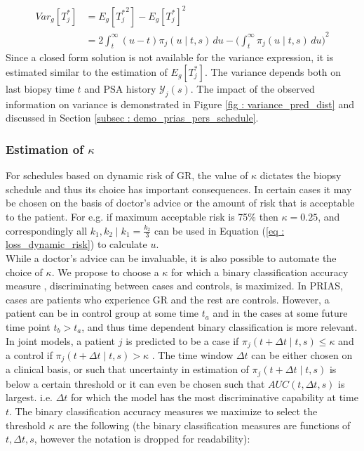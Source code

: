 \begin{equation}
\begin{split}
Var_g[T^*_j] &= E_g[{T^*_j}^2] - {E_g[T^*_j]}^2\\
&= 2 \int_t^\infty {(u-t) \pi_j(u \mid t, s) \,du} - {\bigg(\int_t^\infty \pi_j(u \mid t, s) \,du\bigg)}^2
\end{split}
\end{equation}
Since a closed form solution is not available for the variance expression, it is estimated similar to the estimation of $E_g[T^*_j]$. The variance depends both on last biopsy time $t$ and PSA history $\mathcal{Y}_j(s)$. The impact of the observed information on variance is demonstrated in Figure \ref{fig : variance_pred_dist} and discussed in Section \ref{subsec : demo_prias_pers_schedule}.

\subsubsection{Estimation of $\kappa$}
\label{subsubsec : kappa_estimation}
For schedules based on dynamic risk of GR, the value of $\kappa$ dictates the biopsy schedule and thus its choice has important consequences. In certain cases it may be chosen on the basis of doctor's advice or the amount of risk that is acceptable to the patient. For e.g. if maximum acceptable risk is 75\% then $\kappa = 0.25$, and correspondingly all $k_1, k_2 \mid k_1=\frac{k_2}{3}$ can be used in Equation (\ref{eq : loss_dynamic_risk}) to calculate $u$.\\

While a doctor's advice can be invaluable, it is also possible to automate the choice of $\kappa$. We propose to choose a $\kappa$ for which a binary classification accuracy measure \citep{lopez2014optimalcutpoints,sokolova2009systematic}, discriminating between cases and controls, is maximized. In PRIAS, cases are patients who experience GR and the rest are controls. However, a patient can be in control group at some time $t_a$ and in the cases at some future time point $t_b > t_a$, and thus time dependent binary classification is more relevant. In joint models, a patient $j$ is predicted to be a case if $\pi_j(t + \Delta t \mid t,s) \leq \kappa$ and a control if $\pi_j(t + \Delta t \mid t,s) > \kappa$ \citep{rizopoulosJMbayes}. The time window $\Delta t$ can be either chosen on a clinical basis, or such that uncertainty in estimation of $\pi_j(t + \Delta t \mid t,s)$ is below a certain threshold or it can even be chosen such that $AUC(t, \Delta t, s)$ \citep{rizopoulosJMbayes} is largest. i.e. $\Delta t$ for which the model has the most discriminative capability at time $t$. The binary classification accuracy measures we maximize to select the threshold $\kappa$ are the following (the binary classification measures are functions of $t, \Delta t, s$, however the notation is dropped for readability): 

